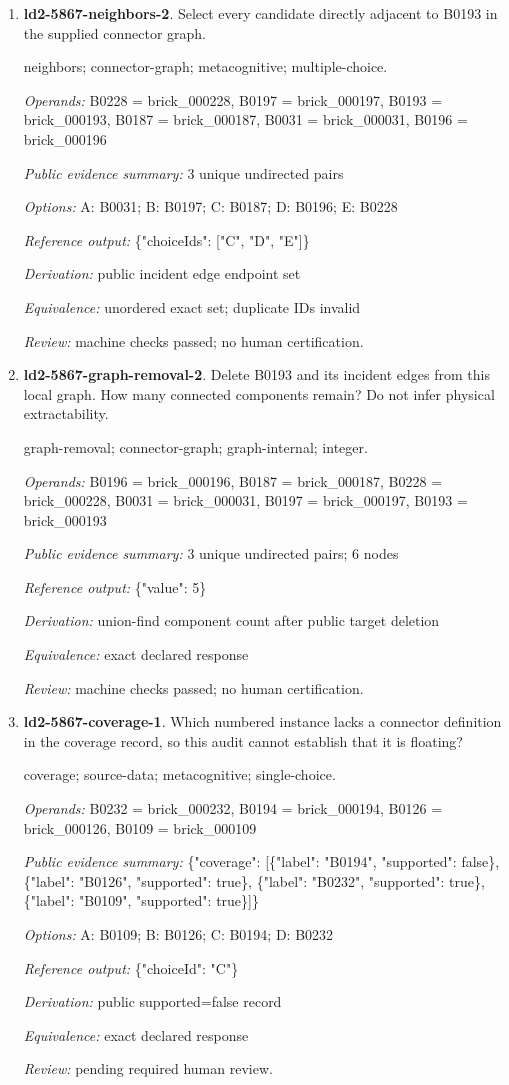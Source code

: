 \begin{enumerate}
\item \textbf{ld2-5867-neighbors-2}. Select every candidate directly adjacent to B0193 in the supplied connector graph.
\par{\small neighbors; connector-graph; metacognitive; multiple-choice.\par\textit{Operands:} B0228 = brick\_000228, B0197 = brick\_000197, B0193 = brick\_000193, B0187 = brick\_000187, B0031 = brick\_000031, B0196 = brick\_000196\par\textit{Public evidence summary:} 3 unique undirected pairs\par\textit{Options:} A: B0031; B: B0197; C: B0187; D: B0196; E: B0228\par\textit{Reference output:} \{"choiceIds": ["C", "D", "E"]\}\par\textit{Derivation:} public incident edge endpoint set\par\textit{Equivalence:} unordered exact set; duplicate IDs invalid\par\textit{Review:} machine checks passed; no human certification.}
\item \textbf{ld2-5867-graph-removal-2}. Delete B0193 and its incident edges from this local graph. How many connected components remain? Do not infer physical extractability.
\par{\small graph-removal; connector-graph; graph-internal; integer.\par\textit{Operands:} B0196 = brick\_000196, B0187 = brick\_000187, B0228 = brick\_000228, B0031 = brick\_000031, B0197 = brick\_000197, B0193 = brick\_000193\par\textit{Public evidence summary:} 3 unique undirected pairs; 6 nodes\par\textit{Reference output:} \{"value": 5\}\par\textit{Derivation:} union-find component count after public target deletion\par\textit{Equivalence:} exact declared response\par\textit{Review:} machine checks passed; no human certification.}
\item \textbf{ld2-5867-coverage-1}. Which numbered instance lacks a connector definition in the coverage record, so this audit cannot establish that it is floating?
\par{\small coverage; source-data; metacognitive; single-choice.\par\textit{Operands:} B0232 = brick\_000232, B0194 = brick\_000194, B0126 = brick\_000126, B0109 = brick\_000109\par\textit{Public evidence summary:} \{"coverage": [\{"label": "B0194", "supported": false\}, \{"label": "B0126", "supported": true\}, \{"label": "B0232", "supported": true\}, \{"label": "B0109", "supported": true\}]\}\par\textit{Options:} A: B0109; B: B0126; C: B0194; D: B0232\par\textit{Reference output:} \{"choiceId": "C"\}\par\textit{Derivation:} public supported=false record\par\textit{Equivalence:} exact declared response\par\textit{Review:} pending required human review.}

\end{enumerate}
